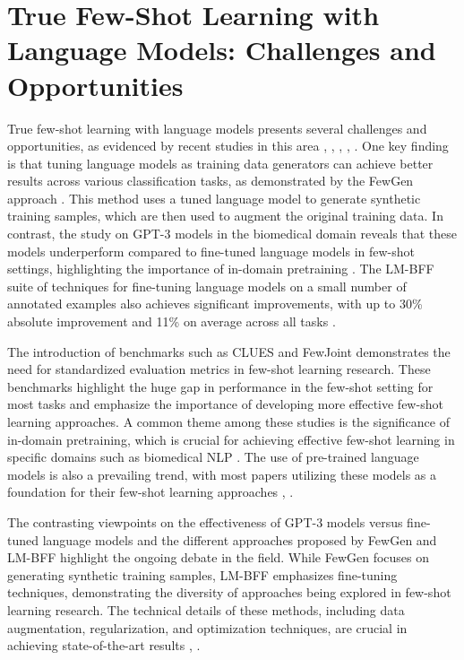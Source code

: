 \documentclass[conference]{IEEEtran}
\begin{document}
\section{True Few-Shot Learning with Language Models: Challenges and Opportunities}
True few-shot learning with language models presents several challenges and opportunities, as evidenced by recent studies in this area \cite{b1}, \cite{b2}, \cite{b3}, \cite{b4}, \cite{b5}. One key finding is that tuning language models as training data generators can achieve better results across various classification tasks, as demonstrated by the FewGen approach \cite{b1}. This method uses a tuned language model to generate synthetic training samples, which are then used to augment the original training data. In contrast, the study on GPT-3 models in the biomedical domain reveals that these models underperform compared to fine-tuned language models in few-shot settings, highlighting the importance of in-domain pretraining \cite{b2}. The LM-BFF suite of techniques for fine-tuning language models on a small number of annotated examples also achieves significant improvements, with up to 30\% absolute improvement and 11\% on average across all tasks \cite{b3}.

The introduction of benchmarks such as CLUES \cite{b4} and FewJoint \cite{b5} demonstrates the need for standardized evaluation metrics in few-shot learning research. These benchmarks highlight the huge gap in performance in the few-shot setting for most tasks and emphasize the importance of developing more effective few-shot learning approaches. A common theme among these studies is the significance of in-domain pretraining, which is crucial for achieving effective few-shot learning in specific domains such as biomedical NLP \cite{b2}. The use of pre-trained language models is also a prevailing trend, with most papers utilizing these models as a foundation for their few-shot learning approaches \cite{b1}, \cite{b3}.

The contrasting viewpoints on the effectiveness of GPT-3 models versus fine-tuned language models \cite{b2} and the different approaches proposed by FewGen \cite{b1} and LM-BFF \cite{b3} highlight the ongoing debate in the field. While FewGen focuses on generating synthetic training samples, LM-BFF emphasizes fine-tuning techniques, demonstrating the diversity of approaches being explored in few-shot learning research. The technical details of these methods, including data augmentation, regularization, and optimization techniques, are crucial in achieving state-of-the-art results \cite{b1}, \cite{b3}.
\end{document}
